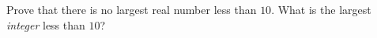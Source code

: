 Prove that there is no largest real number less than $10$. What is the largest \emph{integer} less than $10$?

